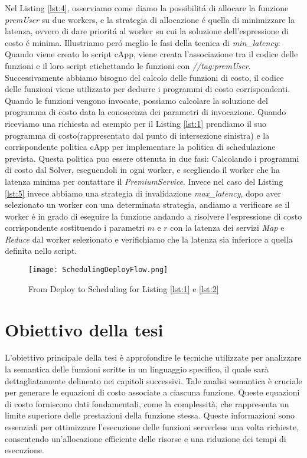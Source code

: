 \documentclass[../../main.tex]{subfiles}
\begin{document}
Nel Listing \ref{lst:4}, osserviamo come diamo la possibilitá di allocare la funzione \textit{premUser} su due workers, e la strategia di allocazione é quella di minimizzare la latenza, ovvero di dare prioritá al worker su cui la soluzione dell'espressione di costo é minima.
Illustriamo peró meglio le fasi della tecnica di \textit{min\_latency}:
Quando viene creato lo script cApp, viene creata l'associazione tra il codice delle funzioni e il loro script etichettando le funzioni con \textit{//tag:premUser}.
Successivamente abbiamo bisogno del calcolo delle funzioni di costo, il codice delle funzioni viene utilizzato per dedurre i programmi di costo corrispondenti.
Quando le funzioni vengono invocate, possiamo calcolare la soluzione del programma di costo data la conoscenza dei parametri di invocazione.
Quando riceviamo una richiesta ad esempio per il Listing \ref{lst:1} prendiamo il suo programma di costo(rappresentato dal punto di intersezione sinistra) e la corrispondente politica cApp per implementare la politica di schedulazione prevista.
Questa politica puo essere ottenuta in due fasi: Calcolando i programmi di costo dal Solver, eseguendoli in ogni worker, e scegliendo il worker che ha latenza minima per contattare il \textit{PremiumService}.
Invece nel caso del Listing \ref{lst:5} invece abbiamo una strategia di invalidazione \textit{max\_latency}, dopo aver selezionato un worker con una determinata strategia, andiamo a verificare se il worker é in grado di eseguire la funzione andando a risolvere l'espressione di costo corrispondente sostituendo i parametri $m$ e $r$ con la latenza dei servizi \textit{Map} e \textit{Reduce} dal worker selezionato e verifichiamo che la latenza sia inferiore a quella definita nello script.\autocite{deserverless}\\
\begin{figure}[H]
    \texttt{[image: SchedulingDeployFlow.png]}
    \centering
    \caption{From Deploy to Scheduling for Listing \ref{lst:1} e \ref{lst:2} }
\end{figure}
\newpage
\section{Obiettivo della tesi}
L'obiettivo principale della tesi è approfondire le tecniche utilizzate per analizzare la semantica delle funzioni scritte in un linguaggio specifico, il quale sarà dettagliatamente delineato nei capitoli successivi. Tale analisi semantica è cruciale per generare le equazioni di costo associate a ciascuna funzione. Queste equazioni di costo forniscono dati fondamentali, come la complessità, che rappresenta un limite superiore delle prestazioni della funzione stessa. Queste informazioni sono essenziali per ottimizzare l'esecuzione delle funzioni serverless una volta richieste, consentendo un'allocazione efficiente delle risorse e una riduzione dei tempi di esecuzione.
\end{document}
